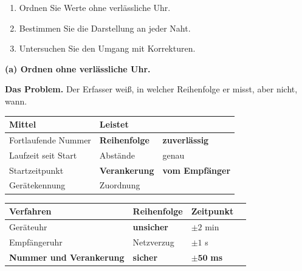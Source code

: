 \begin{aufgabe}
\begin{enumerate}[label=(\alph*)]
\item Ordnen Sie Werte ohne verlässliche Uhr.
\item Bestimmen Sie die Darstellung an jeder Naht.
\item Untersuchen Sie den Umgang mit Korrekturen.
\end{enumerate}

\loesung
\textbf{(a) Ordnen ohne verlässliche Uhr.}

\textbf{Das Problem.} Der Erfasser weiß, in welcher Reihenfolge er misst, aber nicht, wann.

\begin{center}
\renewcommand{\arraystretch}{1.5}
\begin{tabular}{@{}P{3.2cm}P{2.4cm}P{2.4cm}@{}}
\toprule
\textbf{Mittel} & \textbf{Leistet} & \\
\midrule
Fortlaufende Nummer & \textbf{Reihenfolge} & \textcolor{gruen}{\textbf{zuverlässig}}\\
Laufzeit seit Start & Abstände & \textcolor{gruen}{genau}\\
Startzeitpunkt & \textbf{Verankerung} & \textbf{vom Empfänger}\\
Gerätekennung & Zuordnung & \\
\bottomrule
\end{tabular}
\end{center}

\begin{center}
\begin{minipage}{0.88\textwidth}
\end{minipage}
\end{center}

\begin{center}
\renewcommand{\arraystretch}{1.45}
\begin{tabular}{@{}P{3.2cm}P{2.2cm}P{2.0cm}P{1.6cm}@{}}
\toprule
\textbf{Verfahren} & \textbf{Reihen\-folge} & \textbf{Zeitpunkt} & \\
\midrule
Geräteuhr & \textcolor{akzent}{\textbf{unsicher}} & \textcolor{akzent}{$\pm2$ min} & \\
Empfängeruhr & \textcolor{akzent}{Netzverzug} & \textcolor{mittel}{$\pm1$ s} & \\
\textbf{Nummer und Ver\-ankerung} & \textcolor{gruen}{\textbf{sicher}} & \textcolor{gruen}{$\pm\mathbf{50}$ \textbf{ms}} & \\
\bottomrule
\end{tabular}
\end{center}


\end{aufgabe}
